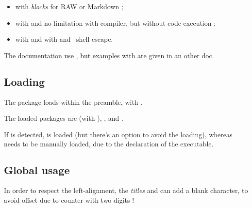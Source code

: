 \documentclass[english,11pt,a4paper]{article}
\begin{document}
\begin{itemize}
	\item with \textit{blocks} for \textsf{RAW} or \textsf{Markdown} ;
	\item with  and no limitation with compiler, but without code execution ;
	\item with  and  with  and \textsf{--shell-escape}.
\end{itemize}

The documentation use , but examples with  are given in an other doc.

\subsection{Loading}

The package loads within the preamble, with .

The loaded packages are  (with ), ,  and .

If  is detected,  is loaded (but there's an option to avoid the loading), whereas  needs to be manually loaded, due to the declaration of the executable.

\begin{codehigh}[language=latex/latex2,style/main=cyan!10,style/code=cyan!10]
\usepackage{pynotebook}
\end{codehigh}

\begin{codehigh}[language=latex/latex2,style/main=cyan!10,style/code=cyan!10]
\usepackage{pynotebook}
\usepackage[options]{pyluatex}
\end{codehigh}

\begin{codehigh}[language=latex/latex2,style/main=cyan!10,style/code=cyan!10]
\usepackage[nopiton]{pynotebook}
\end{codehigh}

\subsection{Global usage}

In order to respect the left-alignment, the \textit{titles}  and  can add a blank character, to avoid offset due to counter with two digits !
\end{document}
